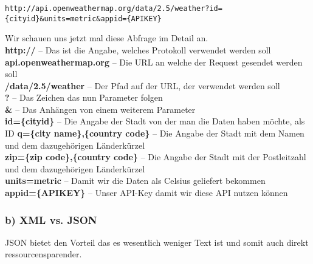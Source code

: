 \begin{lstlisting}
http://api.openweathermap.org/data/2.5/weather?id={cityid}&units=metric&appid={APIKEY}
\end{lstlisting}

Wir schauen uns jetzt mal diese Abfrage im Detail an.\\
	\textbf{http://} -- Das ist die Angabe, welches Protokoll verwendet werden soll\\
	\textbf{api.openweathermap.org} -- Die URL an welche der Request gesendet werden soll\\
	\textbf{/data/2.5/weather} -- Der Pfad auf der URL, der verwendet werden soll\\
	\textbf{?} -- Das Zeichen das nun Parameter folgen\\
	\textbf{\&} -- Das Anhängen von einem weiterem Parameter\\
	\textbf{id=\{cityid\}} -- Die Angabe der Stadt von der man die Daten haben möchte, als ID
	\textbf{q=\{city name\},\{country code\}} -- Die Angabe der Stadt mit dem Namen und dem dazugehörigen Länderkürzel\\
	\textbf{zip=\{zip code\},\{country code\}} -- Die Angabe der Stadt mit der Postleitzahl und dem dazugehörigen Länderkürzel\\
	\textbf{units=metric} -- Damit wir die Daten als Celsius geliefert bekommen\\
	\textbf{appid=\{APIKEY\}} -- Unser API-Key damit wir diese API nutzen können
\newpage
\subsubsection{b) XML vs. JSON}
JSON bietet den Vorteil das es wesentlich weniger Text ist und somit auch direkt ressourcensparender. 
\begin{parcolumns}{2}%
\end{parcolumns} 

